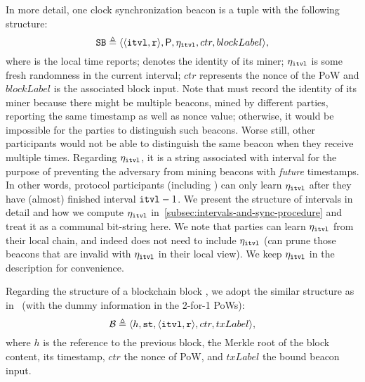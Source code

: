 In more detail, one clock synchronization beacon \beacon is a tuple with the following structure:
%
\[ \mathtt{SB} \triangleq \langle \langle \mathtt{itvl}, \mathtt{r} \rangle, \mathsf{P}, \eta_\mathtt{itvl}, ctr, blockLabel \rangle, \]
%
where \protocolTime{\interval}{\round} is the local time \beacon reports; \party denotes the identity of its miner; $\eta_\mathtt{itvl}$ is some fresh randomness in the current interval; $ctr$ represents the nonce of the PoW and $blockLabel$ is the associated block input.
%
Note that \beacon must record the identity of its miner because there might be multiple beacons, mined by different parties, reporting the same timestamp as well as nonce value; otherwise, it would be impossible for the parties to distinguish such beacons.
%
Worse still, other participants would not be able to distinguish the same beacon \beacon when they receive \beacon multiple times.
%
Regarding $\eta_\mathtt{itvl}$, it is a string associated with interval \interval for the purpose of preventing the adversary \adv from mining beacons with \emph{future} timestamps.
%
In other words, protocol participants (including \adv) can only learn $\eta_\mathtt{itvl}$ after they have (almost) finished interval $\mathtt{itvl} - 1$.
%
We present the structure of intervals in detail and how we compute $\eta_\mathtt{itvl}$ in~\cref{subsec:intervals-and-sync-procedure} and treat it as a communal bit-string here.
%
We note that parties can learn $\eta_\mathtt{itvl}$ from their local chain, and indeed \beacon does not need to include $\eta_\mathtt{itvl}$ (\party can prune those beacons that are invalid with $\eta_\mathtt{itvl}$ in their local view).
%
We keep $\eta_\mathtt{itvl}$ in the description for convenience.

Regarding the structure of a blockchain block \block, we adopt the similar structure as in~\cite{C:GarKiaLeo17} (with the dummy information in the 2-for-1 PoWs):
%
\[ \mathcal{B} \triangleq \langle h, \mathtt{st}, \langle \mathtt{itvl}, \mathtt{r} \rangle, ctr, txLabel \rangle, \]
%
where $h$ is the reference to the previous block, \st the Merkle root of the block content, \protocolTime{\interval}{\round} its timestamp, $ctr$ the nonce of PoW, and $txLabel$ the bound beacon input.

